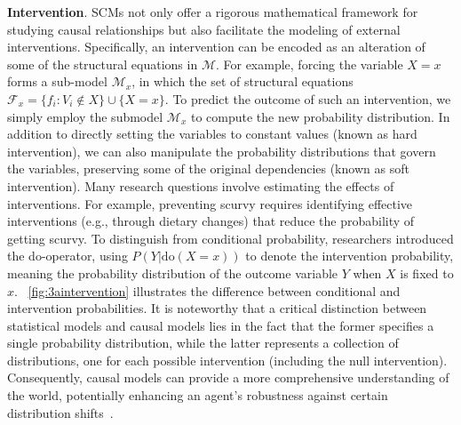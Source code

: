\documentclass[10pt]{article} %
\theoremstyle{definition}
\begin{document}
\textbf{Intervention}. SCMs not only offer a rigorous mathematical framework for studying causal relationships but also facilitate the modeling of external interventions. 
Specifically, an intervention can be encoded as an alteration of some of the structural equations in $\mathcal{M}$. 
For example, forcing the variable $X=x$ forms a sub-model $\mathcal{M}_x$, in which the set of structural equations $\mathcal{F}_x = \{f_i: V_i \notin X\} \cup \{X=x\}$. 
To predict the outcome of such an intervention, we simply employ the submodel $\mathcal{M}_x$ to compute the new probability distribution. 
In addition to directly setting the variables to constant values (known as hard intervention), we can also manipulate the probability distributions that govern the variables, preserving some of the original dependencies (known as soft intervention). 
Many research questions involve estimating the effects of interventions. 
For example, preventing scurvy requires identifying effective interventions (e.g., through dietary changes) that reduce the probability of getting scurvy. 
To distinguish from conditional probability, researchers introduced the do-operator, using $P(Y|\mbox{do}(X=x))$ to denote the intervention probability, meaning the probability distribution of the outcome variable $Y$ when $X$ is fixed to $x$. 
\figurename~\ref{fig:3aintervention} illustrates the difference between conditional and intervention probabilities. 
It is noteworthy that a critical distinction between statistical models and causal models lies in the fact that the former specifies a single probability distribution, while the latter represents a collection of distributions, one for each possible intervention (including the null intervention). 
Consequently, causal models can provide a more comprehensive understanding of the world, potentially enhancing an agent's robustness against certain distribution shifts~\citep{scholkopfCausalRepresentationLearning2021a,thamsCausality2022}.
\end{document}
